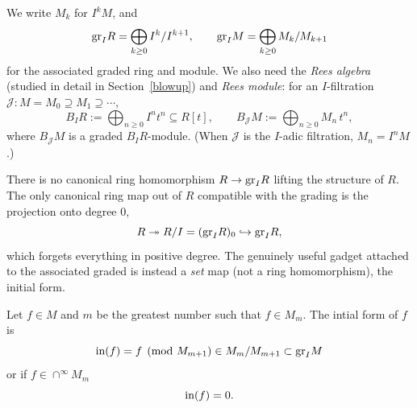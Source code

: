 \documentclass[12pt]{amsproc}
\begin{document}
     
    \begin{notation}
        We write $M_k$ for $I^kM$, and
        \[\text{gr}_I R = \bigoplus_{k \geq 0} I^k/I^{k+1}, \qquad \text{gr}_I M = \bigoplus_{k \geq 0} M_k/M_{k+1}\]
        for the associated graded ring and module.  We also need the \emph{Rees algebra} (studied in detail in Section~\ref{blowup}) and \emph{Rees module}: for an $I$-filtration $\mathcal{J}: M = M_0 \supseteq M_1 \supseteq \cdots$,
        \[B_I R := \bigoplus_{n \geq 0} I^n t^n \subseteq R[t], \qquad B_{\mathcal{J}} M := \bigoplus_{n \geq 0} M_n\, t^n,\]
        where $B_{\mathcal{J}}M$ is a graded $B_I R$-module. (When $\mathcal{J}$ is the $I$-adic filtration, $M_n = I^n M$.)
    \end{notation}



    There is no canonical ring homomorphism $R \to \text{gr}_I R$ lifting the structure of $R$. The only canonical ring map out of $R$ compatible with the grading is the projection onto degree $0$,
    \[R \twoheadrightarrow R/I = (\text{gr}_I R)_0 \hookrightarrow \text{gr}_I R,\]
    which forgets everything in positive degree. The genuinely useful gadget attached to the associated graded is instead a \emph{set} map (not a ring homomorphism), the initial form.


    \begin{definition}
        Let $f \in M$ and $m$ be the greatest number such that $f \in M_m$. The intial form of $f$ is 
        \[\text{in}(f) = f \pmod{M_{m+1}}  \in M_m/M_{m+1} \subset \text{gr}_I M\] 
        or if $f \in \cap^\infty M_m$ 
        \[\text{in}(f) = 0.\]
    \end{definition}
    
\end{document}
